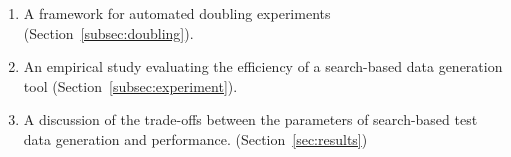 \begin{enumerate}
  \item A framework for automated doubling experiments
    (Section~\ref{subsec:doubling}).
  \item An empirical study evaluating the efficiency of a search-based
    data generation tool (Section~\ref{subsec:experiment}).
  \item A discussion of the trade-offs between the parameters of
    search-based test data generation and performance.  
    (Section~\ref{sec:results})
  \end{enumerate}
